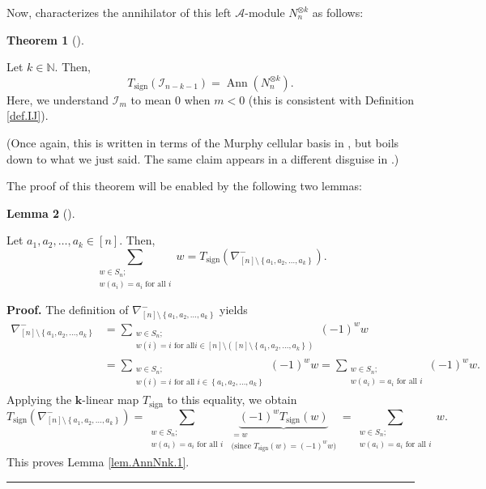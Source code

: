 \documentclass[numbers=enddot,12pt,final,onecolumn,notitlepage]{scrartcl}%
\numberwithin{exer}{subsection}
\theoremstyle{definition}
\newtheorem{theo}{Theorem}[subsection]
\newenvironment{theorem}[1][]
{\begin{theo}[#1]\begin{leftbar}}
{\end{leftbar}\end{theo}}
\newtheorem{lem}[theo]{Lemma}
\newenvironment{lemma}[1][]
{\begin{lem}[#1]\begin{leftbar}}
{\end{leftbar}\end{lem}}
\newenvironment{proof}[1][Proof]{\noindent\textbf{#1.} }{\ \rule{0.5em}{0.5em}}
\let\sumnonlimits\sum
\renewcommand{\sum}{\sumnonlimits\limits}
\begin{document}
Now, \cite[Theorem 7.4 (a)]{BoDoMa18} characterizes the annihilator of this
left $\mathcal{A}$-module $N_{n}^{\otimes k}$ as follows:

\begin{theorem}
\label{thm.AnnNnk}Let $k\in\mathbb{N}$. Then,%
\[
T_{\operatorname*{sign}}\left(  \mathcal{I}_{n-k-1}\right)
=\operatorname*{Ann}\left(  N_{n}^{\otimes k}\right)  .
\]
Here, we understand $\mathcal{I}_{m}$ to mean $0$ when $m<0$ (this is
consistent with Definition \ref{def.IJ}).
\end{theorem}

(Once again, this is written in terms of the Murphy cellular basis in
\cite[Theorem 7.4 (a)]{BoDoMa18}, but boils down to what we just said. The
same claim appears in a different disguise in \cite[Example 2.13]{Donkin24}.)

The proof of this theorem will be enabled by the following two lemmas:

\begin{lemma}
\label{lem.AnnNnk.1}Let $a_{1},a_{2},\ldots,a_{k}\in\left[  n\right]  $. Then,%
\[
\sum_{\substack{w\in S_{n};\\w\left(  a_{i}\right)  =a_{i}\text{ for all }%
i}}w=T_{\operatorname*{sign}}\left(  \nabla_{\left[  n\right]  \setminus
\left\{  a_{1},a_{2},\ldots,a_{k}\right\}  }^{-}\right)  .
\]

\end{lemma}

\begin{proof}
The definition of $\nabla_{\left[  n\right]  \setminus\left\{  a_{1}%
,a_{2},\ldots,a_{k}\right\}  }^{-}$ yields%
\begin{align*}
\nabla_{\left[  n\right]  \setminus\left\{  a_{1},a_{2},\ldots,a_{k}\right\}
}^{-}  &  =\sum_{\substack{w\in S_{n};\\w\left(  i\right)  =i\text{ for all
}i\in\left[  n\right]  \setminus\left(  \left[  n\right]  \setminus\left\{
a_{1},a_{2},\ldots,a_{k}\right\}  \right)  }}\left(  -1\right)  ^{w}w\\
&  =\sum_{\substack{w\in S_{n};\\w\left(  i\right)  =i\text{ for all }%
i\in\left\{  a_{1},a_{2},\ldots,a_{k}\right\}  }}\left(  -1\right)  ^{w}%
w=\sum_{\substack{w\in S_{n};\\w\left(  a_{i}\right)  =a_{i}\text{ for all }%
i}}\left(  -1\right)  ^{w}w.
\end{align*}
Applying the $\mathbf{k}$-linear map $T_{\operatorname*{sign}}$ to this
equality, we obtain%
\[
T_{\operatorname*{sign}}\left(  \nabla_{\left[  n\right]  \setminus\left\{
a_{1},a_{2},\ldots,a_{k}\right\}  }^{-}\right)  =\sum_{\substack{w\in
S_{n};\\w\left(  a_{i}\right)  =a_{i}\text{ for all }i}}\underbrace{\left(
-1\right)  ^{w}T_{\operatorname*{sign}}\left(  w\right)  }%
_{\substack{=w\\\text{(since }T_{\operatorname*{sign}}\left(  w\right)
=\left(  -1\right)  ^{w}w\text{)}}}=\sum_{\substack{w\in S_{n};\\w\left(
a_{i}\right)  =a_{i}\text{ for all }i}}w.
\]
This proves Lemma \ref{lem.AnnNnk.1}.
\end{proof}
\end{document}
